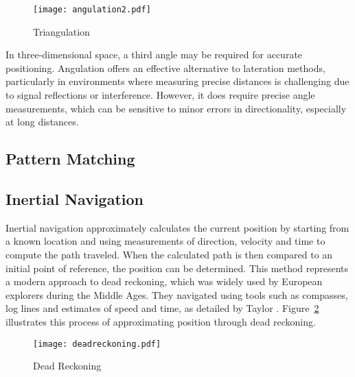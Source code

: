 \begin{figure}[htbp]
    \centering
    \texttt{[image: angulation2.pdf]}
    \caption{Triangulation \cite{militaru2024positioning}}
    \label{fig:angulation2}
\end{figure}

In three-dimensional space, a third angle may be required for accurate positioning. Angulation offers an effective alternative to lateration methods, particularly in environments where measuring precise distances is challenging due to signal reflections or interference. However, it does require precise angle measurements, which can be sensitive to minor errors in directionality, especially at long distances.

\subsection{Pattern Matching}
\subsection{Inertial Navigation}
Inertial navigation approximately calculates the current position by starting from a known location and using measurements of direction, velocity and time to compute the path traveled.
When the calculated path is then compared to an initial point of reference, the position can be determined. 
This method represents a modern approach to dead reckoning, which was widely used by European explorers during the Middle Ages. 
They navigated using tools such as compasses, log lines and estimates of speed and time, as detailed by Taylor \cite{taylor1950deadreckoning}. 
Figure~\ref{fig:deadreckoning} illustrates this process of approximating position through dead reckoning.

\begin{figure}[htbp] 
    \centering \texttt{[image: deadreckoning.pdf]} 
    \caption{Dead Reckoning \cite{wei2022positioning}} 
    \label{fig:deadreckoning} 
\end{figure}


